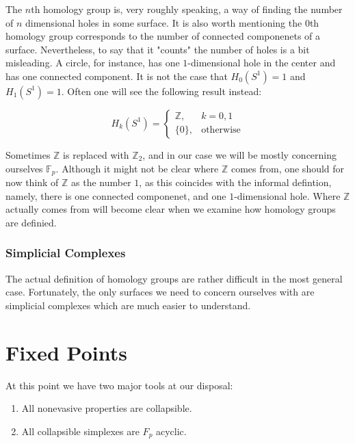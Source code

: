 \documentclass[letterpaper,12pt]{article}
\begin{document}
The $n$th homology group is, very roughly speaking, a way of finding the number of $n$ dimensional holes in some surface. It is also worth mentioning the $0$th homology group corresponds to the number of connected componenets of a surface. Nevertheless, to say that it "counts" the number of holes is a bit misleading. A circle, for instance, has one $1$-dimensional hole in the center and has one connected component. It is not the case that $H_0(S^1) = 1$ and $H_1(S^1) = 1$. Often one will see the following result instead:

$$H_k(S^1) =
\begin{cases}
    \mathbb{Z}, & k = 0, 1 \\
    \{ 0 \}, & \text{otherwise}
\end{cases}
$$

Sometimes $\mathbb{Z}$ is replaced with $\mathbb{Z}_2$, and in our case we will be mostly concerning ourselves $\mathbb{F}_p$. Although it might not be clear where $\mathbb{Z}$ comes from, one should for now think of $\mathbb{Z}$ as the number $1$, as this coincides with the informal defintion, namely, there is one connected componenet, and one $1$-dimensional hole. Where $\mathbb{Z}$ actually comes from will become clear when we examine how homology groups are definied.

\subsubsection{Simplicial Complexes}

The actual definition of homology groups are rather difficult in the most general case. Fortunately, the only surfaces we need to concern ourselves with are simplicial complexes which are much easier to understand.


\section{Fixed Points}

At this point we have two major tools at our disposal:

\begin{enumerate}
    \item{
            All nonevasive properties are collapsible.
        }
    \item{
            All collapsible simplexes are $F_p$ acyclic.
        }
\end{enumerate}
\end{document}

